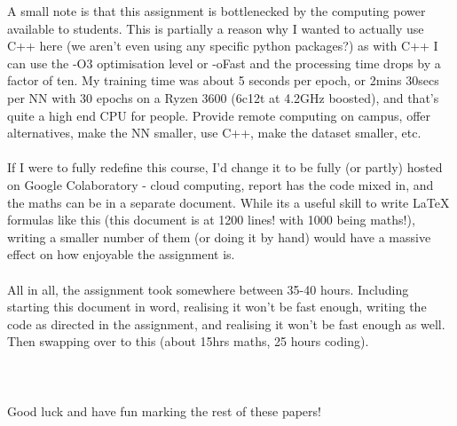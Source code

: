 \documentclass{article}
\begin{document}
A small note is that this assignment is bottlenecked by the computing power
available to students. This is partially a reason why I wanted to actually use
C++ here (we aren't even using any specific python packages?) as with C++ I can
use the -O3 optimisation level or -oFast and the processing time drops by a
factor of ten. My training time was about 5 seconds per epoch, or 2mins 30secs 
per NN with 30 epochs on a Ryzen 3600 (6c12t at 4.2GHz boosted), and that's
quite a high end CPU for people. Provide remote computing on campus, offer
alternatives, make the NN smaller, use C++, make the dataset smaller, etc. \\ \\
If I were to fully redefine this course, I'd change it to be fully (or partly)
hosted on Google Colaboratory - cloud computing, report has the code mixed in,
and the maths can be in a separate document. While its a useful skill to write
LaTeX formulas like this (this document is at 1200 lines! with 1000 being
maths!), writing a smaller number of them (or doing it by hand) would have a
 massive effect on how enjoyable the assignment is. 
    \\ \\
All in all, the assignment took somewhere between 35-40 hours. Including
starting this document in word, realising it won't be fast enough, writing the
code as directed in the assignment, and realising it won't be fast enough as
well. Then swapping over to this (about 15hrs maths, 25 hours coding). 
\\ \\ \\ \\

Good luck and have fun marking the rest of these papers!
\end{document}
